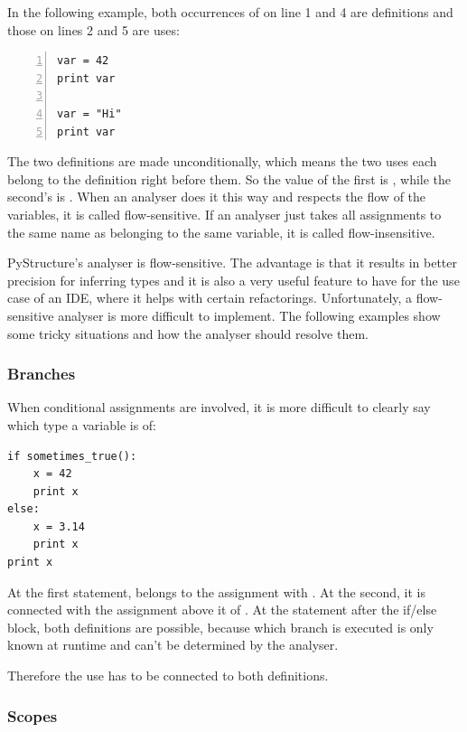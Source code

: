 \documentclass[12pt,halfparskip,DIV11,BCOR10mm]{scrreprt}
\begin{document}
In the following example, both occurrences of  on line 1 and 4 are definitions and those on lines 2 and 5 are uses:

\begin{lstlisting}[numbers=left]
var = 42
print var

var = "Hi"
print var
\end{lstlisting}

The two definitions are made unconditionally, which means the two uses each belong to the definition right before them. So the value of the first  is , while the second's is . When an analyser does it this way and respects the flow of the variables, it is called flow-sensitive. If an analyser just takes all assignments to the same name as belonging to the same variable, it is called flow-insensitive.

PyStructure's analyser is flow-sensitive. The advantage is that it results in better precision for inferring types and it is also a very useful feature to have for the use case of an IDE, where it helps with certain refactorings. Unfortunately, a flow-sensitive analyser is more difficult to implement. The following examples show some tricky situations and how the analyser should resolve them.

\subsubsection{Branches}

When conditional assignments are involved, it is more difficult to clearly say which type a variable is of:

\begin{lstlisting}
if sometimes_true():
    x = 42
    print x
else:
    x = 3.14
    print x
print x
\end{lstlisting}

At the first  statement,  belongs to the assignment with . At the second, it is connected with the assignment above it of . At the  statement after the if/else block, both definitions are possible, because which branch is executed is only known at runtime and can't be determined by the analyser. 

Therefore the use has to be connected to both definitions.

\subsubsection{Scopes}
\end{document}

